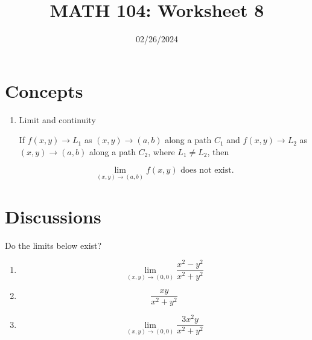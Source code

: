\documentclass[12pt]{amsart}
\title{ MATH 104: Worksheet 8}
\author{}
\date{02/26/2024}
\begin{document}
\maketitle

\section{Concepts}

\begin{enumerate}
    \item Limit and continuity

If \( f(x, y) \to L_1 \) as \( (x, y) \to (a, b) \) along a path \( C_1 \) and \( f(x, y) \to L_2 \) as \( (x, y) \to (a, b) \) along a path \( C_2 \), where \( L_1 \neq L_2 \), then

\[
\lim_{(x, y) \to (a, b)} f(x, y) \text{ does not exist.}
\]

\end{enumerate}

\section{Discussions}
\begin{question}
    Do the limits below exist?
    \begin{enumerate}
        \item 
            \begin{equation*}
        \lim_{(x,y) \to (0,0)} \frac{x^2 - y^2}{x^2 +y^2} 
    \end{equation*}
    \vspace{7cm}


\item 
    \begin{equation*}
        \frac{xy}{x^2 +y^2} 
    \end{equation*}
    \vspace{7cm}

    \item
        \begin{equation*}
            \lim_{(x,y) \to (0,0)} \frac{3x^2 y}{x^2 +y^2} 
        \end{equation*}
    \end{enumerate}
    \vspace{7cm}

\end{question}
\end{document}
